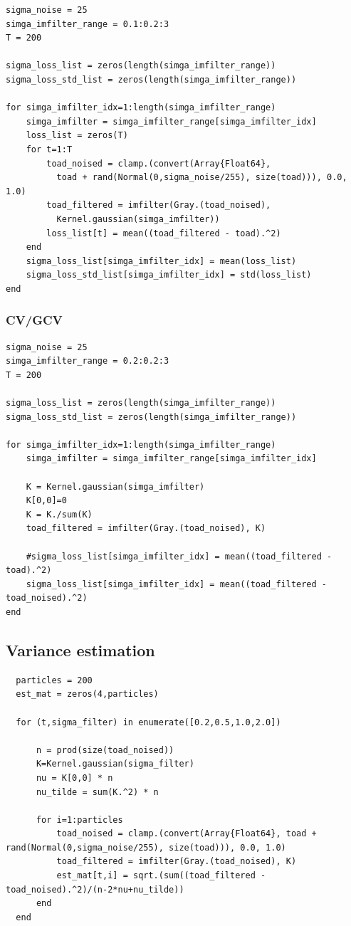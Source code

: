 \documentclass{article}
\begin{document}
\begin{lstlisting}
sigma_noise = 25
simga_imfilter_range = 0.1:0.2:3
T = 200

sigma_loss_list = zeros(length(simga_imfilter_range))
sigma_loss_std_list = zeros(length(simga_imfilter_range))

for simga_imfilter_idx=1:length(simga_imfilter_range)
    simga_imfilter = simga_imfilter_range[simga_imfilter_idx]
    loss_list = zeros(T)
    for t=1:T
        toad_noised = clamp.(convert(Array{Float64}, 
          toad + rand(Normal(0,sigma_noise/255), size(toad))), 0.0, 1.0)
        toad_filtered = imfilter(Gray.(toad_noised), 
          Kernel.gaussian(simga_imfilter))
        loss_list[t] = mean((toad_filtered - toad).^2)
    end
    sigma_loss_list[simga_imfilter_idx] = mean(loss_list)
    sigma_loss_std_list[simga_imfilter_idx] = std(loss_list)
end
\end{lstlisting}

\subsubsection{CV/GCV}

\begin{lstlisting}
sigma_noise = 25
simga_imfilter_range = 0.2:0.2:3
T = 200

sigma_loss_list = zeros(length(simga_imfilter_range))
sigma_loss_std_list = zeros(length(simga_imfilter_range))

for simga_imfilter_idx=1:length(simga_imfilter_range)
    simga_imfilter = simga_imfilter_range[simga_imfilter_idx]
    
    K = Kernel.gaussian(simga_imfilter)
    K[0,0]=0
    K = K./sum(K)
    toad_filtered = imfilter(Gray.(toad_noised), K)
    
    #sigma_loss_list[simga_imfilter_idx] = mean((toad_filtered - toad).^2)
    sigma_loss_list[simga_imfilter_idx] = mean((toad_filtered - toad_noised).^2)
end

\end{lstlisting}

\subsection{Variance estimation}

\begin{lstlisting}
  particles = 200
  est_mat = zeros(4,particles)
  
  for (t,sigma_filter) in enumerate([0.2,0.5,1.0,2.0])
      
      n = prod(size(toad_noised))
      K=Kernel.gaussian(sigma_filter)
      nu = K[0,0] * n
      nu_tilde = sum(K.^2) * n
      
      for i=1:particles
          toad_noised = clamp.(convert(Array{Float64}, toad + rand(Normal(0,sigma_noise/255), size(toad))), 0.0, 1.0)
          toad_filtered = imfilter(Gray.(toad_noised), K)
          est_mat[t,i] = sqrt.(sum((toad_filtered - toad_noised).^2)/(n-2*nu+nu_tilde))
      end
  end

\end{lstlisting}
\end{document}
